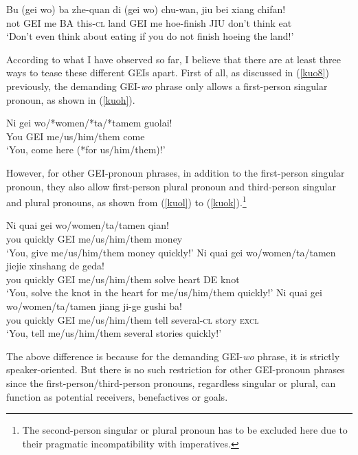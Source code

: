 \documentclass[output=paper,colorlinks,citecolor=brown]{langscibook}
\begin{document}
\ea
\label{kuod}
\gll Bu     (gei wo)    ba zhe-quan di 	    (gei wo) chu-wan,   jiu bei 	xiang	chifan!\\  
     not    GEI me      BA this-\textsc{cl}  land    GEI me   hoe-finish JIU don't   think    eat   \\ 
\glt `Don't even think about eating if you do not finish hoeing the land!'
\z


According to what I have observed so far, I believe that there are at least three ways to tease these different GEIs apart. First of all, as discussed in (\ref{kuo8}) previously, the demanding GEI-\textit{wo} phrase only allows a first-person singular pronoun, as shown in (\ref{kuoh}). 

\ea
\label{kuoh}
\gll Ni     gei wo/*women/*ta/*tamem    guolai!\\  
     You    GEI me/us/him/them          come\\ 
\glt `You, come here (*for us/him/them)!'
\z

However, for other GEI-pronoun phrases, in addition to the first-person singular pronoun, they also allow first-person plural pronoun and third-person singular and plural pronouns, as shown from (\ref{kuol}) to (\ref{kuok}).\footnote{The second-person singular or plural pronoun has to be excluded here due to their pragmatic incompatibility with imperatives.}

\ea
\label{kuol}
\gll Ni     quai    gei wo/women/ta/tamen   qian!\\  
     you    quickly GEI me/us/him/them      money\\ 
\glt `You, give me/us/him/them money quickly!'
\ex
\label{kuoj}
\gll Ni     quai    gei wo/women/ta/tamen   jiejie  xinshang    de  geda!\\  
     you    quickly GEI me/us/him/them      solve   heart       DE  knot\\ 
\glt `You, solve the knot in the heart for me/us/him/them quickly!'
\ex
\label{kuok}
\gll Ni     quai    gei wo/women/ta/tamen   jiang   ji-ge       gushi   ba!\\  
     you    quickly GEI me/us/him/them      tell    several-\textsc{cl}  story   \textsc{excl}\\ 
\glt `You, tell me/us/him/them several stories quickly!'
\z

The above difference is because for the demanding GEI-\textit{wo} phrase, it is strictly speaker-oriented. But there is no such restriction for other GEI-pronoun phrases since the first-person/third-person pronouns, regardless singular or plural, can function as potential receivers, benefactives or goals.
\end{document}
